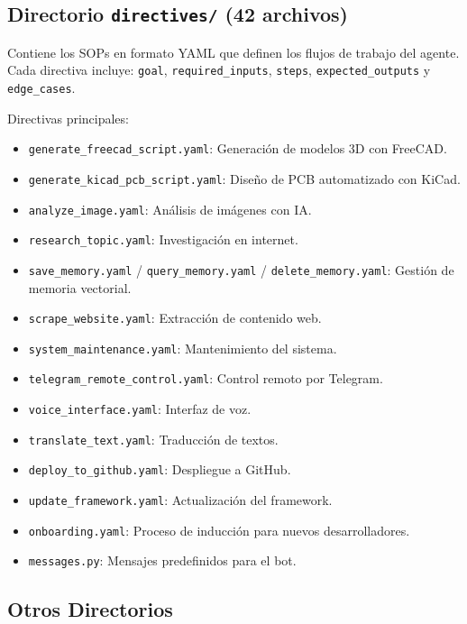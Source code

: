 \documentclass[12pt, a4paper]{article}
\begin{document}
\subsection{Directorio \texttt{directives/} (42 archivos)}

Contiene los SOPs en formato YAML que definen los flujos de trabajo del agente. Cada directiva incluye: \texttt{goal}, \texttt{required\_inputs}, \texttt{steps}, \texttt{expected\_outputs} y \texttt{edge\_cases}.

Directivas principales:
\begin{itemize}[leftmargin=*, itemsep=2pt]
    \item \texttt{generate\_freecad\_script.yaml}: Generación de modelos 3D con FreeCAD.
    \item \texttt{generate\_kicad\_pcb\_script.yaml}: Diseño de PCB automatizado con KiCad.
    \item \texttt{analyze\_image.yaml}: Análisis de imágenes con IA.
    \item \texttt{research\_topic.yaml}: Investigación en internet.
    \item \texttt{save\_memory.yaml} / \texttt{query\_memory.yaml} / \texttt{delete\_memory.yaml}: Gestión de memoria vectorial.
    \item \texttt{scrape\_website.yaml}: Extracción de contenido web.
    \item \texttt{system\_maintenance.yaml}: Mantenimiento del sistema.
    \item \texttt{telegram\_remote\_control.yaml}: Control remoto por Telegram.
    \item \texttt{voice\_interface.yaml}: Interfaz de voz.
    \item \texttt{translate\_text.yaml}: Traducción de textos.
    \item \texttt{deploy\_to\_github.yaml}: Despliegue a GitHub.
    \item \texttt{update\_framework.yaml}: Actualización del framework.
    \item \texttt{onboarding.yaml}: Proceso de inducción para nuevos desarrolladores.
    \item \texttt{messages.py}: Mensajes predefinidos para el bot.
\end{itemize}

\subsection{Otros Directorios}
\end{document}
